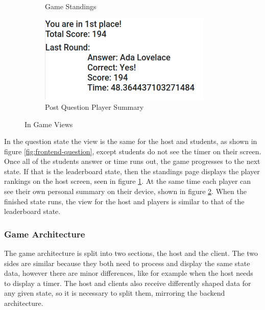 \documentclass{article}
\begin{document}
\begin{figure}[H]
\begin{subfigure}[b]{0.49\textwidth}
                    \caption{Game Standings}
                    \label{fig:frontend-standings}
                \end{subfigure}
                \begin{subfigure}[b]{0.49\textwidth}
                    \centering
                    \includegraphics[width=0.9\textwidth]{images/frontend-player_summary.png}
                    \caption{Post Question Player Summary}
                    \label{fig:frontend-player_summary}
                \end{subfigure}
                \caption{In Game Views}\label{fig:frontend-user_interface}
            \end{figure}
            
            
	        In the question state the view is the same for the host and students, as shown in figure \ref{fig:frontend-question}, except students do not see the timer on their screen. Once all of the students answer or time runs out, the game progresses to the next state. If that is the leaderboard state, then the standings page displays the player rankings on the host screen, seen in figure \ref{fig:frontend-standings}. At the same time each player can see their own personal summary on their device, shown in figure \ref{fig:frontend-player_summary}. When the finished state runs, the view for the host and players is similar to that of the leaderboard state.
	    
	    \subsubsection{Game Architecture}
            The game architecture is split into two sections, the host and the client. The two sides are similar because they both need to process and display the same state data, however there are minor differences, like for example when the host needs to display a timer. The host and clients also receive differently shaped data for any given state, so it is necessary to split them, mirroring the backend architecture.
            \smallskip
            
\end{document}
